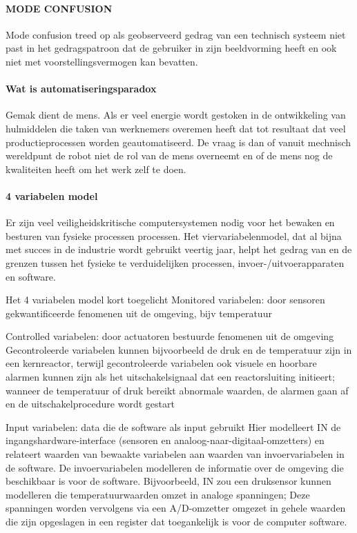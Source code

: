 \documentclass{article}
\begin{document}
	
	\paragraph{MODE CONFUSION }
	Mode confusion treed op als geobserveerd gedrag van een technisch systeem niet past in het gedragspatroon dat de gebruiker in zijn beeldvorming heeft  en ook niet met voorstellingsvermogen kan bevatten.
	
	\paragraph{Wat is automatiseringsparadox}
	Gemak dient de mens. Als er veel energie wordt gestoken in de ontwikkeling van hulmiddelen die taken van werknemers overemen heeft dat tot resultaat dat veel productieprocessen worden geautomatiseerd. De vraag is dan of vanuit mechnisch wereldpunt de robot niet de rol van de mens overneemt en of de mens nog de kwaliteiten heeft om het werk zelf te doen.
	\cite{bicker21102016automatiseringsparadox}
	\cite{vseautoparadox}
	\cite{blogxot21112016slimapparaat}
	
	
	
	\paragraph{4 variabelen model}
	
	Er zijn veel veiligheidskritische computersystemen nodig voor het bewaken en besturen van fysieke processen
	processen. Het viervariabelenmodel, dat al bijna met succes in de industrie wordt gebruikt
	veertig jaar, helpt het gedrag van en de grenzen tussen het fysieke te verduidelijken
	processen, invoer-/uitvoerapparaten en software. \cite{ImplementabilityOf4VarSCP2015}
	
	
	
	Het 4 variabelen model kort toegelicht
	Monitored variabelen: door sensoren gekwantificeerde fenomenen uit de omgeving, bijv temperatuur
	
	Controlled variabelen: door actuatoren bestuurde fenomenen uit de omgeving
	Gecontroleerde variabelen kunnen bijvoorbeeld de druk en de temperatuur zijn
	in een kernreactor, terwijl gecontroleerde variabelen ook visuele en hoorbare alarmen kunnen zijn
	als het uitschakelsignaal dat een reactorsluiting initieert; wanneer de temperatuur of druk bereikt
	abnormale waarden, de alarmen gaan af en de uitschakelprocedure wordt gestart
	
	Input variabelen: data die de software als input gebruikt
	Hier modelleert IN de ingangshardware-interface (sensoren en analoog-naar-digitaal-omzetters) en
	relateert waarden van bewaakte variabelen aan waarden van invoervariabelen in de software. De invoervariabelen modelleren de informatie over de omgeving die beschikbaar is voor de software. Bijvoorbeeld,
	IN zou een druksensor kunnen modelleren die temperatuurwaarden omzet in analoge spanningen; Deze spanningen worden vervolgens via een A/D-omzetter omgezet in gehele waarden die zijn opgeslagen in een register dat toegankelijk is voor de computer
	software.
	
\end{document}
